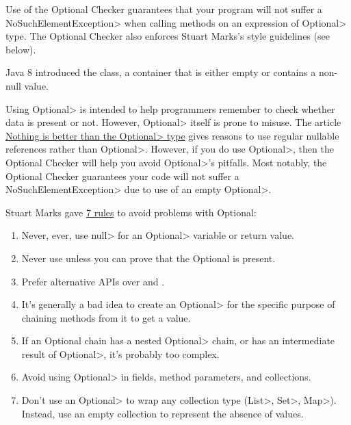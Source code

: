 \htmlhr
{}

Use of the Optional Checker guarantees that your program will not suffer
a \<NoSuchElementException> when calling
methods on an expression of \<Optional> type.
The Optional Checker also enforces Stuart Marks's style guidelines (see below).

Java 8 introduced the 
class, a container that is either empty or contains a non-null value.

Using \<Optional> is intended to help programmers remember to check whether
data is present or not.  However, \<Optional> itself is prone to misuse.
The article
\href{https://homes.cs.washington.edu/~mernst/advice/nothing-is-better-than-optional.html}{Nothing
  is better than the \<Optional> type} gives reasons to use
regular nullable references rather than \<Optional>.  However, if you do use
\<Optional>, then the Optional Checker will help you avoid
\<Optional>'s pitfalls.
Most notably, the Optional Checker guarantees your code will not suffer a
\<NoSuchElementException> due to use of an empty \<Optional>.

Stuart Marks gave
\href{https://stuartmarks.wordpress.com/2016/09/27/vjug24-session-on-optional/}{7
  rules} to avoid problems with Optional:
\begin{enumerate}
\item
  Never, ever, use \<null> for an \<Optional> variable or return value.
\item
  Never use  unless you can prove that the Optional is present.
\item
  Prefer alternative APIs over
  and .
\item
  It's generally a bad idea to create an \<Optional> for the specific
  purpose of chaining methods from it to get a value.
\item
  If an Optional chain has a nested \<Optional> chain, or has an
  intermediate result of \<Optional>, it's probably too complex.
\item
  Avoid using \<Optional> in fields, method parameters, and collections.
\item
  Don't use an \<Optional> to wrap any collection type (\<List>, \<Set>,
  \<Map>).  Instead, use an empty collection to represent the absence of
  values.
\end{enumerate}

